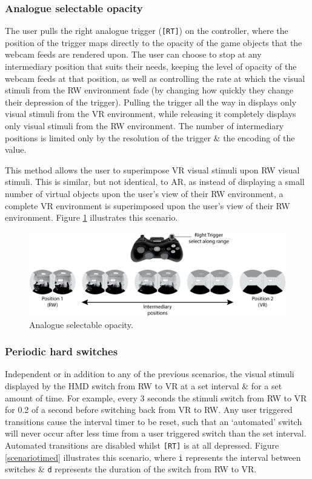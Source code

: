 \subsubsection{Analogue selectable opacity}
The user pulls the right analogue trigger (\texttt{[RT]}) on the controller, where the position of the trigger maps directly to the opacity of the game objects that the webcam feeds are rendered upon. The user can choose to stop at any intermediary position that suits their needs, keeping the level of opacity of the webcam feeds at that position, as well as controlling the rate at which the visual stimuli from the RW environment fade (by changing how quickly they change their depression of the trigger). Pulling the trigger all the way in displays only visual stimuli from the VR environment, while releasing it completely displays only visual stimuli from the RW environment. The number of intermediary positions is limited only by the resolution of the trigger \& the encoding of the value.

This method allows the user to superimpose VR visual stimuli upon RW visual stimuli. This is similar, but not identical, to AR, as instead of displaying a small number of virtual objects upon the user's view of their RW environment, a complete VR environment is superimposed upon the user's view of their RW environment. Figure \ref{scenario2} illustrates this scenario.

\begin{figure}[h]
	\begin{center}
		\includegraphics[width=.9\textwidth]{images/switching-analogue-with-controller.png}
		\caption{Analogue selectable opacity.}
		\label{scenario2}
	\end{center}
\end{figure}

\subsubsection{Periodic hard switches}
\label{subsub-periodic}
Independent or in addition to any of the previous scenarios, the visual stimuli displayed by the HMD switch from RW to VR at a set interval \& for a set amount of time. For example, every 3 seconds the stimuli switch from RW to VR for 0.2 of a second before switching back from VR to RW. Any user triggered transitions cause the interval timer to be reset, such that an `automated' switch will never occur after less time from a user triggered switch than the set interval. Automated transitions are disabled whilst \texttt{[RT]} is at all depressed. Figure \ref{scenariotimed} illustrates this scenario, where \texttt{i} represents the interval between switches \& \texttt{d} represents the duration of the switch from RW to VR.


